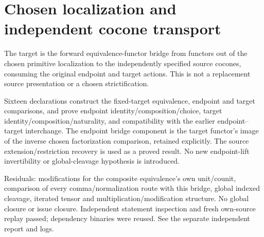 \documentclass{article}
\begin{document}
\section*{Chosen localization and independent cocone transport}
The target is the forward equivalence-functor bridge from functors out of the chosen primitive localization to the independently specified source cocones, consuming the original endpoint and target actions. This is not a replacement source presentation or a chosen strictification.

Sixteen declarations construct the fixed-target equivalence, endpoint and target comparisons, and prove endpoint identity/composition/choice, target identity/composition/naturality, and compatibility with the earlier endpoint--target interchange. The endpoint bridge component is the target functor's image of the inverse chosen factorization comparison, retained explicitly. The source extension/restriction recovery is used as a proved result. No new endpoint-lift invertibility or global-cleavage hypothesis is introduced.

Residuals: modifications for the composite equivalence's own unit/counit, comparison of every comma/normalization route with this bridge, global indexed cleavage, iterated tensor and multiplication/modification structure. No global closure or issue closure. Independent statement inspection and fresh own-source replay passed; dependency binaries were reused. See the separate independent report and logs.
\end{document}
